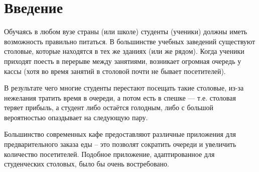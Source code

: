 \documentclass[14pt]{matmex-diploma-custom}
\begin{document}
\maketitle
\tableofcontents

\section{Введение}
    Обучаясь в любом вузе страны (или школе) студенты (ученики) должны иметь возможность правильно питаться.
    В большинстве учебных заведений существуют столовые, которые находятся в тех же зданиях (или же рядом).
    Когда ученики приходят поесть в перерыве между занятиями, возникает огромная очередь у кассы (хотя во время занятий в столовой почти не бывает посетителей).

    В результате чего многие студенты перестают посещать такие столовые, из-за нежелания тратить время в очереди, а потом есть в спешке — т.е. столовая теряет прибыль, а студент либо остаётся голодным, либо с большой вероятностью опаздывает на следующую пару.

    Большинство современных кафе предоставляют различные приложения для предварительного заказа еды -- это позволят сократить очереди и увеличить количество посетителей. Подобное приложение, адаптированное для студенческих столовых, было бы очень востребовано.
\end{document}

